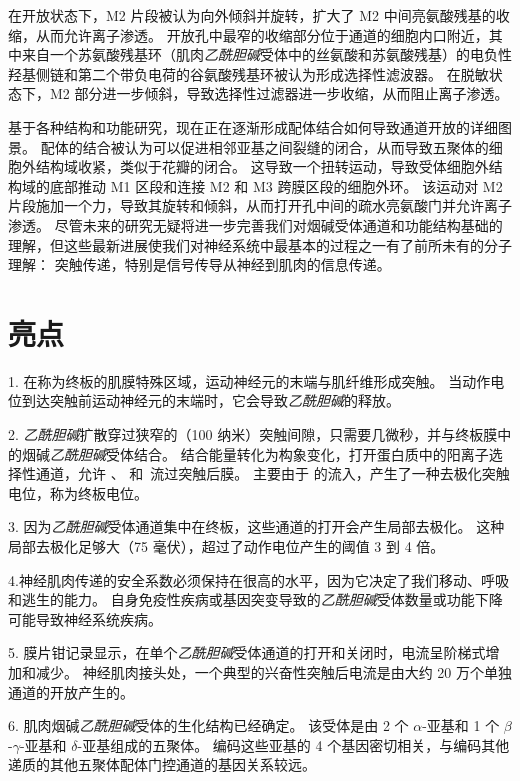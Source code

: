 在开放状态下，M2 片段被认为向外倾斜并旋转，扩大了 M2 中间亮氨酸残基的收缩，从而允许离子渗透。
开放孔中最窄的收缩部分位于通道的细胞内口附近，其中来自一个苏氨酸残基环（肌肉\textit{乙酰胆碱}受体中的丝氨酸和苏氨酸残基）的电负性羟基侧链和第二个带负电荷的谷氨酸残基环被认为形成选择性滤波器。
在脱敏状态下，M2 部分进一步倾斜，导致选择性过滤器进一步收缩，从而阻止离子渗透。


基于各种结构和功能研究，现在正在逐渐形成配体结合如何导致通道开放的详细图景。
配体的结合被认为可以促进相邻亚基之间裂缝的闭合，从而导致五聚体的细胞外结构域收紧，类似于花瓣的闭合。
这导致一个扭转运动，导致受体细胞外结构域的底部推动 M1 区段和连接 M2 和 M3 跨膜区段的细胞外环。
该运动对 M2 片段施加一个力，导致其旋转和倾斜，从而打开孔中间的疏水亮氨酸门并允许离子渗透。
尽管未来的研究无疑将进一步完善我们对烟碱受体通道和功能结构基础的理解，但这些最新进展使我们对神经系统中最基本的过程之一有了前所未有的分子理解：
突触传递，特别是信号传导从神经到肌肉的信息传递。



\section{亮点}

1. 在称为终板的肌膜特殊区域，运动神经元的末端与肌纤维形成突触。
当动作电位到达突触前运动神经元的末端时，它会导致\textit{乙酰胆碱}的释放。


2. \textit{乙酰胆碱}扩散穿过狭窄的（100 纳米）突触间隙，只需要几微秒，并与终板膜中的烟碱\textit{乙酰胆碱}受体结合。
结合能量转化为构象变化，打开蛋白质中的阳离子选择性通道，允许 、 和~流过突触后膜。
主要由于  的流入，产生了一种去极化突触电位，称为终板电位。


3. 因为\textit{乙酰胆碱}受体通道集中在终板，这些通道的打开会产生局部去极化。
这种局部去极化足够大（75 毫伏），超过了动作电位产生的阈值 3 到 4 倍。


4.神经肌肉传递的安全系数必须保持在很高的水平，因为它决定了我们移动、呼吸和逃生的能力。
自身免疫性疾病或基因突变导致的\textit{乙酰胆碱}受体数量或功能下降可能导致神经系统疾病。 


5. 膜片钳记录显示，在单个\textit{乙酰胆碱}受体通道的打开和关闭时，电流呈阶梯式增加和减少。
神经肌肉接头处，一个典型的兴奋性突触后电流是由大约 20 万个单独通道的开放产生的。 


6. 肌肉烟碱\textit{乙酰胆碱}受体的生化结构已经确定。
该受体是由 2 个 $\alpha$-亚基和 1 个 $\beta$-$\gamma$-亚基和 $\delta$-亚基组成的五聚体。
编码这些亚基的 4 个基因密切相关，与编码其他递质的其他五聚体配体门控通道的基因关系较远。


